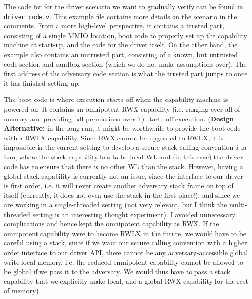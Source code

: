 \documentclass{article}
\newcommand{\T}[1]{\texttt{#1}}
\begin{document}
The code for for the driver scenario we want to gradually verify can
be found in \T{driver\_code.v}. This example file contains more details on the
scenario in the comments. From a more high-level perspective, it contains a
trusted part, consisting of a single MMIO location, boot code to properly set up
the capability machine at start-up, and the code for the driver itself. On the
other hand, the example also contains an untrusted part, consisting of a known,
but untrusted code section and sandbox section (which we do not make assumptions
over).
The first address of the adversary code section is what the trusted part jumps
to once it has finished setting up.

The boot code is where execution starts off when the capability machine is
powered on.
It contains an omnipotent RWX capability (i.e. ranging over all of memory and
providing full permissions over it) starts off execution.
(\textbf{Design Alternative:} in the long run, it might be worthwhile to provide
the boot code with a RWLX capability. Since RWX cannot be upgraded to RWLX, it
is impossible in the current setting to develop a secure stack calling
convention \'a la Lau, where the stack capability has to be local-WL and (in this
case) the driver code has to ensure that there is no other WL than the stack.
However, having a global stack capability is currently not an issue, since the interface to our driver is first order, i.e. it will
never create another adversary stack frame on top of itself (currently, it does
not even use the stack in the first place!), and since we are working in a
single-threaded setting (not very relevant, but I think the multi-threaded
setting is an interesting thought experiment). I avoided unnecessary
complications and hence kept the omnipotent capability as RWX. If the omnipotent
capability were to become RWLX in the future, we would have to be careful using
a stack, since if we want our secure calling convention with a higher order
interface to our driver API, there cannot be any adversary-accessible global
write-local memory, i.e. the reduced omnipotent capability cannot be allowed to be global if we pass it to the adversary. We would thus have to pass a stack capability that we explicitly make local, and a global RWX capability for the rest of memory)
\end{document}
